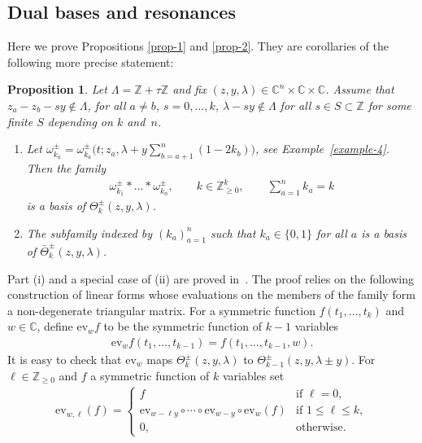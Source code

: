 \documentclass[pdftex]{sigma}
\numberwithin{equation}{section}
\newtheorem{Proposition}[Theorem]{Proposition}
 { \theoremstyle{definition}
\newtheorem{Definition}[Theorem]{Definition}
\newtheorem{Example}[Theorem]{Example}
\newtheorem{Remark}[Theorem]{Remark} }
\begin{document}
\subsection{Dual bases and resonances}\label{ss-3.12}
Here we prove Propositions \ref{prop-1} and \ref{prop-2}. They are corollaries of the following more precise statement:
\begin{Proposition}\label{prop-6} Let $\Lambda=\mathbb Z+\tau\mathbb Z$ and fix $(z,y,\lambda)\in\mathbb C^n\times \mathbb C\times \mathbb C$. Assume that $z_a-z_b-sy\not\in\Lambda$, for all $a\neq b$, $s=0,\dots,k$, $\lambda-sy\not\in\Lambda$ for all $s\in S\subset\mathbb Z$ for some finite $S$ depending on $k$ and~$n$.
 \begin{enumerate}\itemsep=0pt
 \item[$(i)$] Let $\omega^\pm_{k_a}=\omega_{k_a}^\pm\Big(t;z_a,\lambda+y\sum\limits_{b=a+1}^n(1-2k_b)\Big)$, see Example~{\rm \ref{example-4}}. Then the family
 \begin{gather*}
 \omega^\pm_{k_1}*\dots*\omega^\pm_{k_n}, \qquad k\in\mathbb Z^k_{\geq0},\qquad\sum_{a=1}^n k_a=k
 \end{gather*}
 is a basis of $\Theta^\pm_k(z,y,\lambda)$.
 \item[$(ii)$] The subfamily indexed by $(k_a)_{a=1}^n$ such that $k_a\in\{0,1\}$ for all $a$ is a basis of $\bar\Theta^\pm_k(z,y,\lambda)$.
 \end{enumerate}
\end{Proposition}
Part (i) and a special case of (ii) are proved in~\cite{FelderTarasovVarchenko1997}. The proof relies on the following construction of linear forms whose evaluations on the members of the family form a non-degenerate triangular matrix. For a symmetric function $f(t_1,\dots,t_k)$ and $w\in\mathbb C$, define $\mathrm{ev}_wf$ to be the symmetric function of $k-1$ variables
\begin{gather*}
 \mathrm{ev}_wf(t_1,\dots,t_{k-1})=f(t_1,\dots,t_{k-1},w).
\end{gather*}
It is easy to check that $\mathrm{ev}_w$ maps $\Theta^\pm_k(z,y,\lambda)$ to $\Theta^\pm_{k-1}(z,y,\lambda\pm y)$. For $\ell\in\mathbb Z_{\geq0}$ and $f$ a symmetric function of $k$ variables set
\begin{gather*}
 \mathrm{ev}_{w,\ell}(f)=\begin{cases}
 f&\text{if $\ell=0$},\\
 \mathrm{ev}_{w-\ell y}\circ\cdots\circ\mathrm{ev}_{w-y}\circ\mathrm{ev}_w(f) &\text{if $1\leq\ell\leq k$},\\
 0,&\text{otherwise}.
 \end{cases}
\end{gather*}
\end{document}
